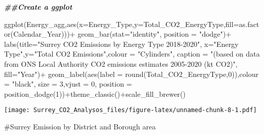 \documentclass[
]{article}
\newenvironment{Shaded}{\begin{snugshade}}{\end{snugshade}}
\newcommand{\AttributeTok}[1]{\textcolor[rgb]{0.77,0.63,0.00}{#1}}
\newcommand{\DecValTok}[1]{\textcolor[rgb]{0.00,0.00,0.81}{#1}}
\newcommand{\DocumentationTok}[1]{\textcolor[rgb]{0.56,0.35,0.01}{\textbf{\textit{#1}}}}
\newcommand{\FunctionTok}[1]{\textcolor[rgb]{0.00,0.00,0.00}{#1}}
\newcommand{\NormalTok}[1]{#1}
\newcommand{\SpecialCharTok}[1]{\textcolor[rgb]{0.00,0.00,0.00}{#1}}
\newcommand{\StringTok}[1]{\textcolor[rgb]{0.31,0.60,0.02}{#1}}
\begin{document}
\begin{Shaded}
\begin{Highlighting}[]
\DocumentationTok{\#\#Create a ggplot}

\FunctionTok{ggplot}\NormalTok{(Energy\_agg,}\FunctionTok{aes}\NormalTok{(}\AttributeTok{x=}\NormalTok{Energy\_Type,}\AttributeTok{y=}\NormalTok{Total\_CO2\_EnergyType,}\AttributeTok{fill=}\FunctionTok{as.factor}\NormalTok{(Calendar\_Year)))}\SpecialCharTok{+}
   \FunctionTok{geom\_bar}\NormalTok{(}\AttributeTok{stat=}\StringTok{"identity"}\NormalTok{, }\AttributeTok{position =} \StringTok{"dodge"}\NormalTok{)}\SpecialCharTok{+} \FunctionTok{labs}\NormalTok{(}\AttributeTok{title=}\StringTok{"Surrey CO2 Emissions by Energy Type 2018{-}2020"}\NormalTok{, }\AttributeTok{x=}\StringTok{"Energy Type"}\NormalTok{,}\AttributeTok{y=}\StringTok{"Total CO2 Emissions"}\NormalTok{,}\AttributeTok{colour =} \StringTok{"Cylinders"}\NormalTok{, }\AttributeTok{caption =} \StringTok{"(based on data from  ONS Local Authority CO2 emissions estimates 2005{-}2020 (kt CO2)"}\NormalTok{, }\AttributeTok{fill=}\StringTok{"Year"}\NormalTok{)}\SpecialCharTok{+} 
  \FunctionTok{geom\_label}\NormalTok{(}\FunctionTok{aes}\NormalTok{(}\AttributeTok{label =} \FunctionTok{round}\NormalTok{(Total\_CO2\_EnergyType,}\DecValTok{0}\NormalTok{)),}\AttributeTok{colour =} \StringTok{"black"}\NormalTok{, }\AttributeTok{size =} \DecValTok{3}\NormalTok{,}\AttributeTok{vjust =} \DecValTok{0}\NormalTok{, }\AttributeTok{position =} \FunctionTok{position\_dodge}\NormalTok{(}\DecValTok{1}\NormalTok{))}\SpecialCharTok{+}\FunctionTok{theme\_classic}\NormalTok{()}\SpecialCharTok{+}\FunctionTok{scale\_fill\_brewer}\NormalTok{()}
\end{Highlighting}
\end{Shaded}

\texttt{[image: Surrey\_CO2\_Analysos\_files/figure-latex/unnamed-chunk-8-1.pdf]}

\#Surrey Emission by District and Borough area
\end{document}
